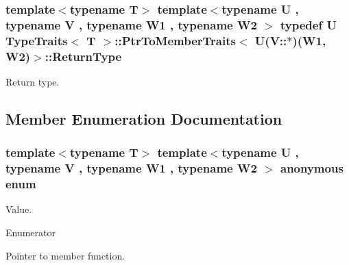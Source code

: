 \subsubsection[{\texorpdfstring{Return\+Type}{ReturnType}}]{\setlength{\rightskip}{0pt plus 5cm}template$<$typename T$>$ template$<$typename U , typename V , typename W1 , typename W2 $>$ typedef U {\bf Type\+Traits}$<$ T $>$\+::{\bf Ptr\+To\+Member\+Traits}$<$ U(V\+::$\ast$)(W1, W2)$>$\+::{\bf Return\+Type}}\hypertarget{structTypeTraits_1_1PtrToMemberTraits_3_01U_07V_1_1_5_08_07W1_00_01W2_08_4_a5aa75fcb1f0d8a604c1affc1a63c96c1}{}\label{structTypeTraits_1_1PtrToMemberTraits_3_01U_07V_1_1_5_08_07W1_00_01W2_08_4_a5aa75fcb1f0d8a604c1affc1a63c96c1}
Return type. 

\subsection{Member Enumeration Documentation}
\subsubsection[{\texorpdfstring{anonymous enum}{anonymous enum}}]{\setlength{\rightskip}{0pt plus 5cm}template$<$typename T$>$ template$<$typename U , typename V , typename W1 , typename W2 $>$ anonymous enum}\hypertarget{structTypeTraits_1_1PtrToMemberTraits_3_01U_07V_1_1_5_08_07W1_00_01W2_08_4_aaa7045aefbea304f8ef365a035f0f007}{}\label{structTypeTraits_1_1PtrToMemberTraits_3_01U_07V_1_1_5_08_07W1_00_01W2_08_4_aaa7045aefbea304f8ef365a035f0f007}
Value. \begin{Desc}
\item[Enumerator]\par
\begin{description}
\item[{\em 
Is\+Pointer\+To\+Member\hypertarget{structTypeTraits_1_1PtrToMemberTraits_3_01U_07V_1_1_5_08_07W1_00_01W2_08_4_aaa7045aefbea304f8ef365a035f0f007a3a0e9d0078f16918b44d01cfef20d34f}{}\label{structTypeTraits_1_1PtrToMemberTraits_3_01U_07V_1_1_5_08_07W1_00_01W2_08_4_aaa7045aefbea304f8ef365a035f0f007a3a0e9d0078f16918b44d01cfef20d34f}
}]Pointer to member function. \end{description}
\end{Desc}

